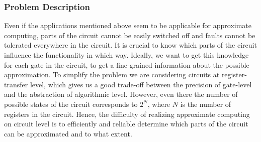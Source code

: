 \documentclass[conference]{IEEEtran}
\begin{document}
\subsubsection*{Problem Description}
Even if the applications mentioned above seem to be applicable for approximate computing, parts of the circuit cannot be easily switched off and faults cannot be tolerated everywhere in the circuit. It is crucial to know which parts of the circuit influence the functionality in which way. Ideally, we want to get this knowledge for each gate in the circuit, to get a fine-grained information about the possible approximation. To simplify the problem we are considering circuits at register-transfer level, which gives us a good trade-off between the precision of gate-level and the abstraction of algorithmic level. However, even there the number of possible states of the circuit corresponds to $2^N$, where $N$ is the number of registers in the circuit. Hence, the difficulty of realizing approximate computing on circuit level is to efficiently and reliable determine which parts of the circuit can be approximated and to what extent.
\end{document}
